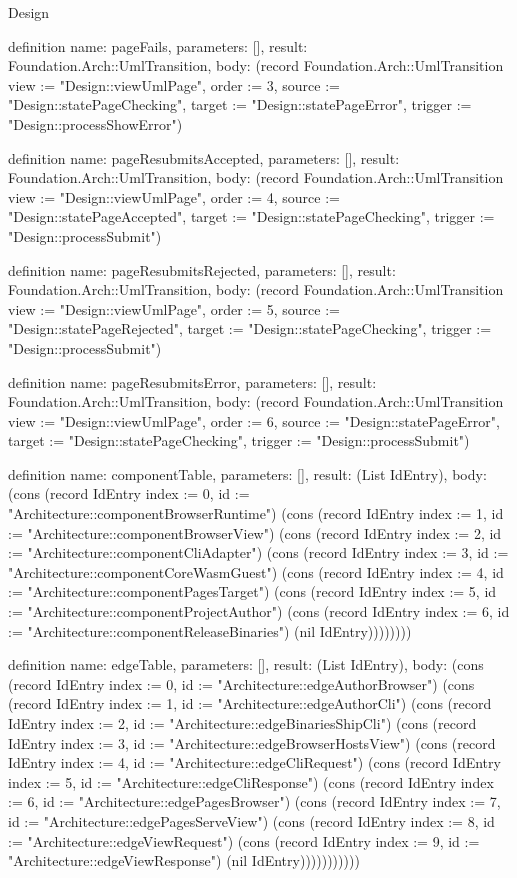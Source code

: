 \begin{lexlean}{Design}
\begin{semanticmodule}
definition{
  name: pageFails,
  parameters: [],
  result: Foundation.Arch::UmlTransition,
  body: (record Foundation.Arch::UmlTransition {view := "Design::viewUmlPage", order := 3, source := "Design::statePageChecking", target := "Design::statePageError", trigger := "Design::processShowError"})
}

definition{
  name: pageResubmitsAccepted,
  parameters: [],
  result: Foundation.Arch::UmlTransition,
  body: (record Foundation.Arch::UmlTransition {view := "Design::viewUmlPage", order := 4, source := "Design::statePageAccepted", target := "Design::statePageChecking", trigger := "Design::processSubmit"})
}

definition{
  name: pageResubmitsRejected,
  parameters: [],
  result: Foundation.Arch::UmlTransition,
  body: (record Foundation.Arch::UmlTransition {view := "Design::viewUmlPage", order := 5, source := "Design::statePageRejected", target := "Design::statePageChecking", trigger := "Design::processSubmit"})
}

definition{
  name: pageResubmitsError,
  parameters: [],
  result: Foundation.Arch::UmlTransition,
  body: (record Foundation.Arch::UmlTransition {view := "Design::viewUmlPage", order := 6, source := "Design::statePageError", target := "Design::statePageChecking", trigger := "Design::processSubmit"})
}

definition{
  name: componentTable,
  parameters: [],
  result: (List IdEntry),
  body: (cons (record IdEntry {index := 0, id := "Architecture::componentBrowserRuntime"}) (cons (record IdEntry {index := 1, id := "Architecture::componentBrowserView"}) (cons (record IdEntry {index := 2, id := "Architecture::componentCliAdapter"}) (cons (record IdEntry {index := 3, id := "Architecture::componentCoreWasmGuest"}) (cons (record IdEntry {index := 4, id := "Architecture::componentPagesTarget"}) (cons (record IdEntry {index := 5, id := "Architecture::componentProjectAuthor"}) (cons (record IdEntry {index := 6, id := "Architecture::componentReleaseBinaries"}) (nil IdEntry))))))))
}

definition{
  name: edgeTable,
  parameters: [],
  result: (List IdEntry),
  body: (cons (record IdEntry {index := 0, id := "Architecture::edgeAuthorBrowser"}) (cons (record IdEntry {index := 1, id := "Architecture::edgeAuthorCli"}) (cons (record IdEntry {index := 2, id := "Architecture::edgeBinariesShipCli"}) (cons (record IdEntry {index := 3, id := "Architecture::edgeBrowserHostsView"}) (cons (record IdEntry {index := 4, id := "Architecture::edgeCliRequest"}) (cons (record IdEntry {index := 5, id := "Architecture::edgeCliResponse"}) (cons (record IdEntry {index := 6, id := "Architecture::edgePagesBrowser"}) (cons (record IdEntry {index := 7, id := "Architecture::edgePagesServeView"}) (cons (record IdEntry {index := 8, id := "Architecture::edgeViewRequest"}) (cons (record IdEntry {index := 9, id := "Architecture::edgeViewResponse"}) (nil IdEntry)))))))))))
}


\end{semanticmodule}
\end{lexlean}
